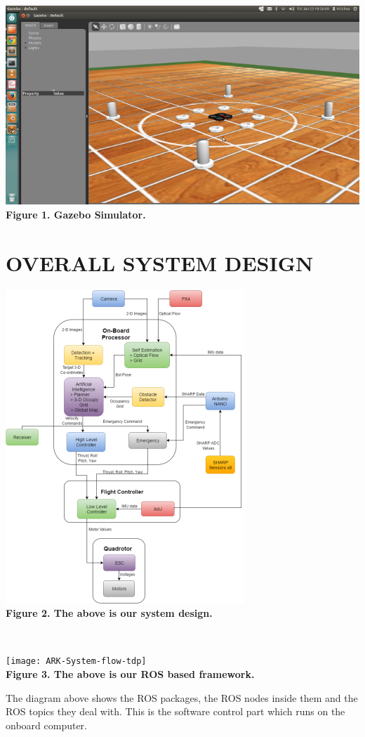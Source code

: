 \documentclass[12pt]{article}
\begin{document}
\begin{center}\includegraphics[scale=0.5]{image23} \\
\textbf{Figure 1. Gazebo Simulator.}\end{center}

\section{OVERALL SYSTEM DESIGN}
\begin{center}\includegraphics{image22} \\
\textbf{Figure 2. The above is our system design.}\end{center} \\
\begin{center}\texttt{[image: ARK-System-flow-tdp]} \\
\textbf{Figure 3. The above is our ROS based framework.}\end{center}
The diagram above shows the ROS packages, the ROS nodes inside them and the ROS topics they deal with.
This is the software control part which runs on the onboard computer.
\end{document}
